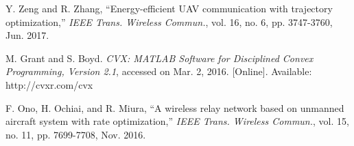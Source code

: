 \documentclass[journal]{IEEEtran}
\begin{document}
\begin{thebibliography}{1}
Y. Zeng and R. Zhang, ``Energy-efficient UAV communication with trajectory optimization,'' {\em IEEE Trans.
Wireless Commun.}, vol. 16, no. 6, pp. 3747-3760, Jun. 2017.

M. Grant and S. Boyd. {\em CVX: MATLAB Software for Disciplined Convex
Programming, Version 2.1}, accessed on Mar. 2, 2016. [Online]. Available:
http://cvxr.com/cvx

F. Ono, H. Ochiai, and R. Miura, ``A wireless relay network based on unmanned aircraft system with rate optimization,'' {\em IEEE Trans. Wireless Commun.}, vol. 15, no. 11, pp. 7699-7708, Nov. 2016.


\end{thebibliography}
\end{document}
